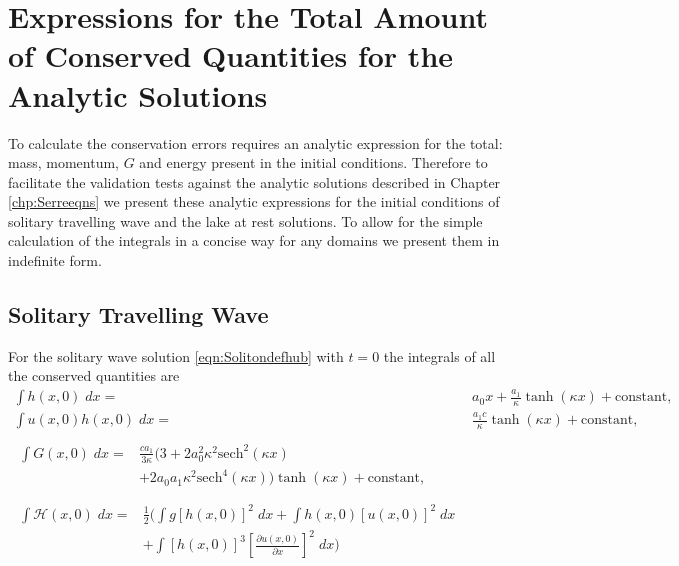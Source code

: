 \chapter{Expressions for the Total Amount of Conserved Quantities for the Analytic Solutions}
\label{app:ConQuant}
To calculate the conservation errors requires an analytic expression for the total: mass, momentum, $G$ and energy present in the initial conditions. Therefore to facilitate the validation tests against the analytic solutions described in Chapter \ref{chp:Serreeqns} we present these analytic expressions for the initial conditions of solitary travelling wave and the lake at rest solutions. To allow for the simple calculation of the integrals in a concise way for any domains we present them in indefinite form. 

\section{Solitary Travelling Wave}
For the solitary wave solution \eqref{eqn:Solitondefhub} with $t=0$ the integrals of all the conserved quantities are
\allowdisplaybreaks
\begin{subequations}
	\begin{align}
	\int h(x,0) \; dx = {} & a_0 x + \frac{a_1}{\kappa} \tanh\left(\kappa x\right) + \text{constant}, \\
	\int u(x,0)h(x,0) \;  dx = {} & \frac{a_1 c}{\kappa} \tanh\left(\kappa x\right)+ \text{constant}, \\  \nonumber \\
	\begin{split}
	\int G(x,0) \; dx = {}&  \frac{c a_1}{3 \kappa}  \Bigg(3 + 2a_0^2 \kappa^2\text{sech}^2\left(\kappa x\right)  \\ &+ 2a_0 a_1 \kappa^2 \text{sech}^4\left(\kappa x\right) \Bigg)\tanh\left(\kappa x\right)  + \text{constant} ,
	\end{split}
	\\  \nonumber \\
	\begin{split}
	\int \mathcal{H}(x,0) \; dx = {}&\frac{1}{2} \Bigg(\int g\left[h(x,0)\right]^2 \; dx + \int h(x,0)\left[u(x,0)\right]^2 \; dx  \\ &+ \int \left[h(x,0)\right]^3 \left[\frac{\partial u(x,0)}{\partial x}\right]^2 \; dx \Bigg) 
	\end{split}
	\end{align}
	\label{eqn:SolitonConservation}
\end{subequations}

